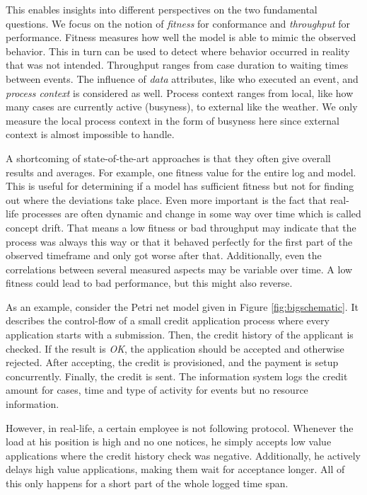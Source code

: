 This enables insights into different perspectives on the two fundamental questions.
We focus on the notion of \emph{fitness} for conformance and \emph{throughput} for performance.
Fitness measures how well the model is able to mimic the observed behavior. This in turn can be used to detect where behavior occurred in reality that was not intended. Throughput ranges from case duration to waiting times between events.
The influence of \emph{data} attributes, like who executed an event, and \emph{process context} is considered as well.
Process context ranges from local, like how many cases are currently active (busyness), to external like the weather. We only measure the local process context in the form of busyness here since external context is almost impossible to handle.

A shortcoming of state-of-the-art approaches is that they often give overall results and averages. For example, one fitness value for the entire log and model. This is useful for determining if a model has sufficient fitness but not for finding out where the deviations take place. Even more important is the fact that real-life processes are often dynamic and change in some way over time which is called concept drift. That means a low fitness or bad throughput may indicate that the process was always this way or that it behaved perfectly for the first part of the observed timeframe and only got worse after that. Additionally, even the correlations between several measured aspects may be variable over time. A low fitness could lead to bad performance, but this might also reverse.

As an example, consider the Petri net model given in Figure \ref{fig:bigschematic}. It describes the control-flow of a small credit application process where every application starts with a submission. Then, the credit history of the applicant is checked. If the result is \emph{OK}, the application should be accepted and otherwise rejected. After accepting, the credit is provisioned, and the payment is setup concurrently. Finally, the credit is sent. The information system logs the credit amount for cases, time and type of activity for events but no resource information.

However, in real-life, a certain employee is not following protocol. Whenever the load at his position is high and no one notices, he simply accepts low value applications where the credit history check was negative. Additionally, he actively delays high value applications, making them wait for acceptance longer. All of this only happens for a short part of the whole logged time span.

